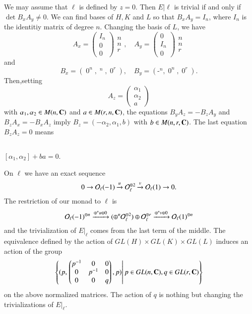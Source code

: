 We may assume that $\ell$ is defined by $z=0$. Then $E |\ell$ is trivial if and only if $\det B_{x}A_{y} \neq 0$. We can find bases of $H, K$ and $L$ so that $B_{x}A_{y} = I_{n}$, where $I_{n}$ is the identitiy matrix of degree $n$. Changing the basis of $L$, we have
$$
A_{x}= \begin{pmatrix}
I_{n}\\
0\\
0
\end{pmatrix}
\begin{matrix}
n\\
n\\
r
\end{matrix}
,\quad
A_{y}=\begin{pmatrix}
0\\
I_{n}\\
0
\end{pmatrix}
\begin{matrix}
n\\
n\\
r
\end{matrix}
$$
and
$$
\displaystyle B_{x}=(\mathop{0}^{n}, \mathop{I_{n}}^{n}, \mathop{0}^{r}), \quad \displaystyle B_{y}=(\mathop{-I_{n}}^{n}, \mathop{0}^{n}, \mathop{0}^{r}).
$$
Then,\pageoriginale setting
$$
A_{z}=\begin{pmatrix}
\alpha_{1}\\
\alpha_{2}\\
a
\end{pmatrix}
$$
with $\alpha_{1} ,\alpha_{2} \in M(n, \mathbf{C})$ and $a \in M(r,n,\mathbf{C})$, the equations $B_{y}A_{z} = -B_{z}A_{y}$ and $B_{z}A_{x} = -B_{x}A_{z}$ imply $B_{z}=(-\alpha_{2}, \alpha_{1},b)$ with $b \in M(n,r,\mathbf{C})$. The last equation $B_{z}A_{z} = 0$ means
 
\setcounter{subsection}{1}
\subsection{}\label{chap12-subsec-1.2}
$[\alpha_{1}, \alpha_{2}] + ba =0$.

On $\ell$ we have an exact sequence
$$
0 \rightarrow \mathcal{O}_{\ell}(-1)\xrightarrow{u}\mathcal{O}_{\ell}^{\oplus 2} \xrightarrow{v}\mathcal{O}_{\ell}(1) \rightarrow 0.
$$
The restriction of our monad to $\ell$ is
$$
\mathcal{O}_{\ell}(-1)^{\oplus n} \xrightarrow{\oplus^{n}u\oplus 0}(\oplus^{n}\mathcal{O}_{\ell}^{\oplus 2}) \oplus \mathcal{O}_{\ell}^{\oplus r} \xrightarrow{\oplus^{n}v\oplus 0} \mathcal{O}_{\ell}(1)^{\oplus n}
$$
and the trivialization of $E|_{\ell}$ comes from the last term of the middle. The equivalence defined by the action of $GL(H) \times GL(K) \times GL(L)$ induces an action of the group
$$
\left\{(p,\left. \begin{pmatrix}
p^{-1} & 0 & 0\\
0 & p^{-1} & 0\\
0 &  0 & q
\end{pmatrix}, p) \right| p \in GL(n, \mathbf{C}), q \in GL(r, \mathbf{C})\right\}
$$
on the above normalized matrices. The action of $q$ is nothing but changing the trivializations of $E|_{\ell}$.

